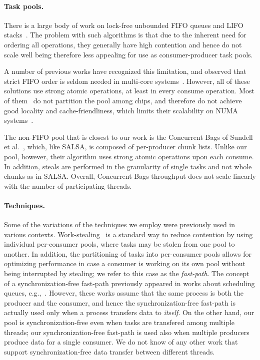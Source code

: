 \paragraph{Task pools.}
There is a large body of work on lock-free unbounded FIFO queues and LIFO
stacks~\cite{Gidenstam:2010:CLQ:1940234.1940266,Hendler:2004:SLS:1007912.1007944,
Hoffman:2007:BQ:1782394.1782423, Michael:1996:SFP:248052.248106,Moir:2005:UEI:1073970.1074013}.
The problem with such algorithms is that due to the inherent need for ordering all operations, they
generally have high contention and hence do not scale well being therefore less appealing for use as 
consumer-producer task pools. 

A number of previous works have recognized this limitation, and observed that strict FIFO
order is seldom needed in multi-core systems~\cite{Afek:2010:SPP:1885276.1885295,springerlink:10.1007/978-3-642-17653-1_29,
Basin:2011:CST:2075029.2075087,Sundell:2011:LAC:1989493.1989550}. However, all of these solutions
use strong atomic operations, at least in every consume operation. Most of
them~\cite{Afek:2010:SPP:1885276.1885295,springerlink:10.1007/978-3-642-17653-1_29,
Basin:2011:CST:2075029.2075087} do not partition the pool among chips, and therefore do not achieve
good locality and cache-friendliness, which limits their scalability on NUMA systems~\cite{Basin:Thesis:2011}.

The non-FIFO pool that is closest to our work is the Concurrent Bags of
Sundell et al.~\cite{Sundell:2011:LAC:1989493.1989550}, which, like SALSA, is composed of
per-producer chunk lists. Unlike our pool, however, their algorithm uses strong atomic operations
upon each consume. In addition, steals are performed in the granularity of single tasks and
not whole chunks as in SALSA. Overall, Concurrent Bags throughput does not scale linearly with the number of participating threads.

\paragraph{Techniques.}
Some of the variations of the techniques we employ were previously used in various contexts. 
Work-stealing~\cite{Blumofe:1999:SMC:324133.324234} is a standard way to reduce
contention by using individual per-consumer pools, where tasks may be stolen from one pool to
another. 
In addition, the partitioning of tasks into per-consumer pools allows for optimizing performance in 
case a consumer is working on its own pool without being interrupted by stealing; we refer to
this case as the \emph{fast-path}. The concept of a synchronization-free fast-path previously
appeared in works about scheduling queues,
e.g.,~\cite{Arora:1998:TSM:277651.277678,Hendler:2006:DNW:1160290.1160294}. However, these works
assume that the same process is both the producer and the consumer, and hence the
synchronization-free fast-path is actually used only when a process transfers data to \emph{itself}.
On the other hand, our pool is synchronization-free even when tasks are transfered among multiple
threads; our synchronization-free fast-path is used also when multiple producers produce data for
a single consumer. We do not know of any other work that support synchronization-free data
transfer between different threads.

